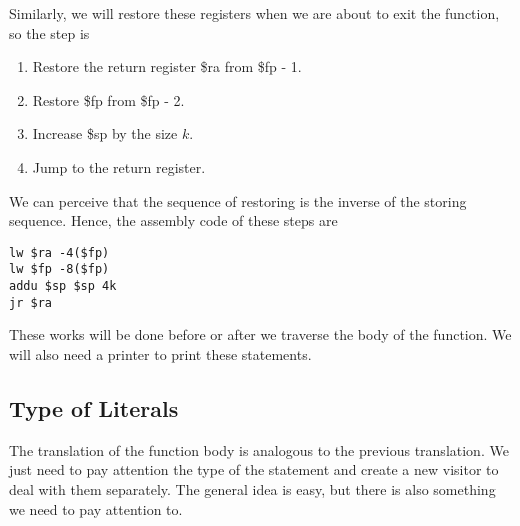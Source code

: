 \documentclass[letterpaper, 14pt]{article}
\begin{document}
Similarly, we will restore these registers when we are about to exit the function, so the step is
\begin{enumerate}
\item Restore the return register \$ra from \$fp - 1. 
\item Restore \$fp from \$fp - 2. 
\item Increase \$sp by the size $k$. 
\item Jump to the return register. 
\end{enumerate}

We can perceive that the sequence of restoring is the inverse of the storing sequence. Hence, the assembly code of these steps are
\begin{lstlisting}
lw $ra -4($fp)
lw $fp -8($fp)
addu $sp $sp 4k
jr $ra
\end{lstlisting}

These works will be done before or after we traverse the body of the function. We will also need a printer to print these statements. 

\subsection{Type of Literals}

The translation of the function body is analogous to the previous translation. We just need to pay attention the type of the statement and create a new visitor to deal with them separately. The general idea is easy, but there is also something we need to pay attention to. 
\end{document}
